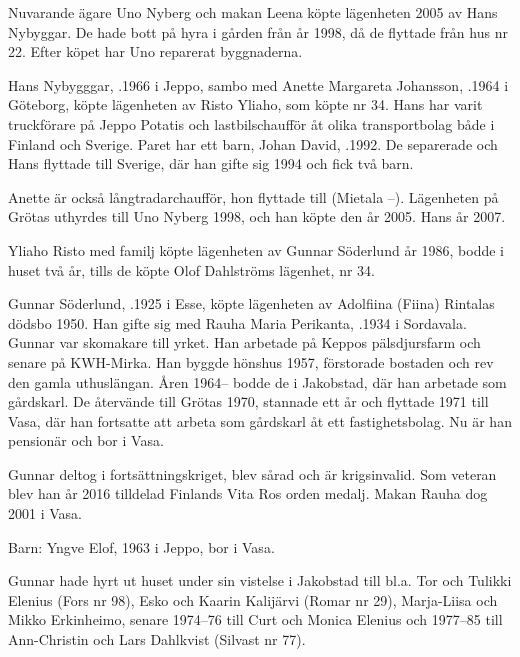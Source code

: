 

Nuvarande ägare Uno Nyberg och makan Leena köpte lägenheten 2005 av Hans Nybyggar. De hade bott på hyra i gården från år 1998, då de flyttade från hus nr 22. Efter köpet har Uno reparerat byggnaderna.\jhvspace{}



Hans Nybygggar, .1966 i Jeppo, sambo med Anette Margareta Johansson, .1964 i Göteborg, köpte lägenheten av Risto Yliaho, som köpte nr 34. Hans har varit truckförare på Jeppo Potatis och lastbilschaufför åt olika transportbolag både i Finland och Sverige. Paret har ett barn, Johan David, .1992. De separerade och Hans flyttade till Sverige, där han gifte sig 1994 och fick två barn.

Anette är också långtradarchaufför, hon flyttade till (Mietala --).  Lägenheten på Grötas uthyrdes till Uno Nyberg 1998, och han köpte den år 2005.
Hans \textdied år 2007.


Yliaho Risto med familj köpte lägenheten av Gunnar Söderlund år 1986, bodde i huset två år, tills de köpte Olof Dahlströms lägenhet, nr 34.\jhvspace{}


Gunnar Söderlund, .1925 i Esse, köpte lägenheten av Adolfiina (Fiina) Rintalas dödsbo 1950. Han gifte sig med Rauha Maria Perikanta, .1934 i Sordavala. Gunnar var skomakare till yrket. Han arbetade på Keppos pälsdjursfarm och senare på KWH-Mirka. Han byggde hönshus 1957, förstorade bostaden och rev den gamla uthuslängan. Åren 1964-- bodde de i Jakobstad, där han arbetade som gårdskarl. De återvände till Grötas 1970, stannade ett år och flyttade 1971 till Vasa, där han fortsatte  att arbeta som  gårdskarl åt ett fastighetsbolag. Nu är han pensionär och bor i Vasa.

Gunnar deltog i fortsättningskriget, blev sårad och är krigsinvalid. Som veteran blev han år 2016 tilldelad Finlands Vita Ros orden medalj. Makan Rauha dog 2001 i Vasa.

Barn: Yngve Elof,  1963 i Jeppo, bor i Vasa.

Gunnar hade hyrt ut huset under sin vistelse i Jakobstad till bl.a. Tor och Tulikki Elenius (Fors nr 98), Esko och Kaarin Kalijärvi (Romar nr 29), Marja-Liisa och Mikko Erkinheimo, senare 1974--76 till Curt och Monica Elenius och 1977--85 till Ann-Christin och Lars Dahlkvist (Silvast nr 77).


